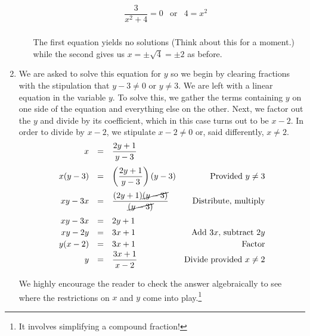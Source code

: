\documentclass{ximera}
\begin{document}
\begin{example}
\begin{enumerate}
\begin{itemize}
\[\begin{array}{rclr}
\dfrac{3}{x^2+4} = 0 & \text{or} & 4 = x^2 & \\ \end{array} \]

The first equation yields no solutions (Think about this for a moment.) while the second gives us $x = \pm \sqrt{4} = \pm 2$ as before.


\end{itemize}

\item  We are asked to solve this equation for $y$ so we begin by clearing fractions with the stipulation that $y-3 \neq 0$ or $y \neq 3$.   We are left with a linear equation in the variable $y$.  To solve this, we gather the terms containing $y$ on one side of the equation and everything else on the other.  Next, we factor out the $y$ and divide by its coefficient, which in this case turns out to be $x-2$.  In order to divide by $x-2$, we stipulate $x - 2 \neq 0$ or, said differently, $x \neq 2$. \[ \begin{array}{rclr}

 x & = & \dfrac{2y+1}{y-3} & \\ [12pt]

x(y-3) & = & \left(\dfrac{2y+1}{y-3}\right)(y-3) & \text{Provided $y \neq 3$} \\ [12pt]

xy - 3x & = & \dfrac{(2y+1)\cancel{(y-3)}}{\cancel{(y-3)}} & \text{Distribute, multiply} \\ [12pt]

xy - 3x & = & 2y + 1 & \\ [2pt]

xy - 2y & = & 3x+1 & \text{Add $3x$, subtract $2y$} \\ [2pt]

y(x-2) & = & 3x+1 & \text{Factor} \\ [2pt]

y & = & \dfrac{3x+1}{x-2} & \text{Divide provided $x \neq 2$} \\

\end{array}\]

We highly encourage the reader to check the answer algebraically to see where the restrictions on $x$ and $y$ come into play.\footnote{It involves simplifying a compound fraction!}


\end{enumerate}
\end{example}
\end{document}
